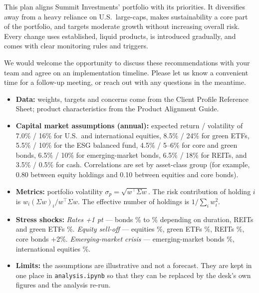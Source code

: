 \documentclass[11pt]{article}
\let\oldheading\heading
\renewcommand{\heading}[1]{\Needspace{8\baselineskip}\oldheading{#1}}
\begin{document}
This plan aligns Summit Investments' portfolio with its priorities. It
diversifies away from a heavy reliance on U.S.\ large-caps, makes
sustainability a core part of the portfolio, and targets moderate growth
without increasing overall risk. Every change uses established, liquid
products, is introduced gradually, and comes with clear monitoring rules and
triggers.

We would welcome the opportunity to discuss these recommendations with your
team and agree on an implementation timeline. Please let us know a convenient
time for a follow-up meeting, or reach out with any questions in the meantime.

\newpage
{}
\begin{itemize}[leftmargin=1.5em, itemsep=3pt]
  \item \textbf{Data:} weights, targets and concerns come from the Client
  Profile Reference Sheet; product characteristics from the Product Alignment
  Guide.
  \item \textbf{Capital market assumptions (annual):} expected return /
  volatility of 7.0\% / 16\% for U.S.\ and international equities, 8.5\% / 24\%
  for green ETFs, 5.5\% / 10\% for the ESG balanced fund, 4.5\% / 5--6\% for
  core and green bonds, 6.5\% / 10\% for emerging-market bonds, 6.5\% / 18\% for
  REITs, and 3.5\% / 0.5\% for cash. Correlations are set by asset-class group
  (for example, 0.80 between equity holdings and 0.10 between equities and
  core bonds).
  \item \textbf{Metrics:} portfolio volatility $\sigma_p=\sqrt{w^\top\Sigma
  w}$. The risk contribution of holding $i$ is $w_i(\Sigma w)_i/w^\top\Sigma
  w$. The effective number of holdings is $1/\sum_i w_i^2$.
  \item \textbf{Stress shocks:} \emph{Rates +1 pt} --- bonds \% to
  \% depending on duration, REITs and green ETFs \%.
  \emph{Equity sell-off} --- equities \%, green ETFs \%,
  REITs \%, core bonds +2\%. \emph{Emerging-market crisis} ---
  emerging-market bonds \%, international equities
  \%.
  \item \textbf{Limits:} the assumptions are illustrative and not a forecast.
  They are kept in one place in \texttt{analysis.ipynb} so that they can be
  replaced by the desk's own figures and the analysis re-run.
\end{itemize}
\end{document}
